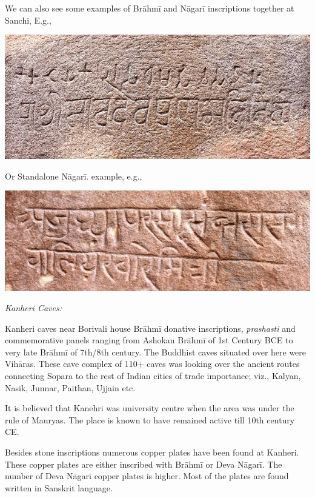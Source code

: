 We can also see some examples of Brāhmī and Nāgarī inscriptions together at Sanchi, E.g.,

\vskip 3pt

\centerline{\includegraphics[scale=0.2]{"images/article-06/art06-fig04.jpg"}}

Or Standalone Nāgarī. example, e.g.,

\vskip 3pt

\centerline{\includegraphics[scale=0.2]{"images/article-06/art06-fig05.jpg"}}

\textit{Kanheri Caves:}

Kanheri caves near Borivali house Brāhmī donative inscriptions, \textit{prashasti} and commemorative panels ranging from Ashokan Brāhmī of 1st Century BCE to very late Brāhmī of 7th/8th century. The Buddhist caves situated over here were Vihāras. These cave complex of 110+ caves was looking over the ancient routes connecting Sopara to the rest of Indian cities of trade importance; viz., Kalyan, Nasik, Junnar, Paithan, Ujjain etc.

It is believed that Kanehri was university centre when the area was under the rule of Mauryas. The place is known to have remained active till 10th century CE.

Besides stone inscriptions numerous copper plates have been found at Kanheri. These copper plates are either inscribed with Brāhmī or Deva Nāgarī. The number of Deva Nāgarī copper plates is higher. Most of the plates are found written in Sanskrit language.

